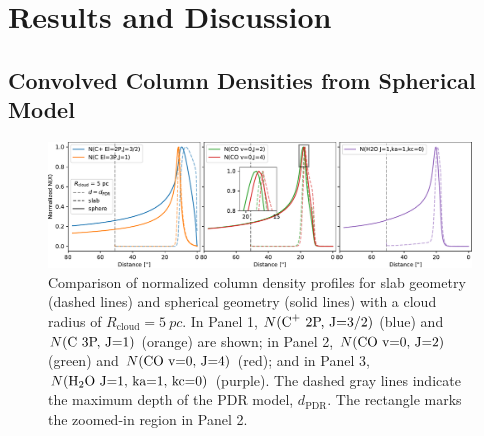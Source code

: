 \documentclass[12pt,a4paper]{article}
\newcommand{\mr}{\mathrm}
\newcommand{\qt}[1]{}
\begin{document}
\qt{figure on convolution?}



\section{Results and Discussion} \label{sec:results}
\subsection{Convolved Column Densities from Spherical Model} \label{sec:convcolden}

\begin{figure}
    \centering
    \includegraphics[width=\textwidth,keepaspectratio]{column_densities.pdf}
    \caption{Comparison of normalized column density profiles for slab geometry (dashed lines) and spherical geometry (solid lines) with a cloud radius of $R_\mr{cloud} = \qty{5}{pc}$. In Panel 1, $N(\ce{C^+}\ \text{2P, J=3/2})$ (blue) and $N(\ce{C}\ \text{3P, J=1})$ (orange) are shown; in Panel 2, $N(\ce{CO}\ \text{v=0, J=2})$ (green) and $N(\ce{CO}\ \text{v=0, J=4})$ (red); and in Panel 3, $N(\ce{H2O}\ \text{J=1, ka=1, kc=0})$ (purple). The dashed gray lines indicate the maximum depth of the PDR model, $d_\mr{PDR}$. The rectangle marks the zoomed-in region in Panel 2.} \label{fig:colden}  
\end{figure}
\end{document}
